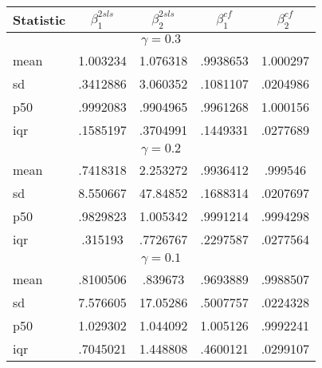 
\begin{tabular}{|l|c|c|c|c|}
\hline
Statistic & $\beta_1^{2sls}$ & $\beta_2^{2sls}$ & $\beta_1^{cf}$ & $\beta_2^{cf}$ \\ \hline
\multicolumn{5}{|c|}{$\gamma = 0.3$} \\ \hline
mean & 1.003234 & 1.076318 & .9938653 & 1.000297 \\
sd & .3412886 & 3.060352 & .1081107 & .0204986 \\
p50 & .9992083 & .9904965 & .9961268 & 1.000156 \\
iqr & .1585197 & .3704991 & .1449331 & .0277689 \\ \hline
\multicolumn{5}{|c|}{$\gamma = 0.2$} \\ \hline
mean & .7418318 & 2.253272 & .9936412 & .999546 \\
sd & 8.550667 & 47.84852 & .1688314 & .0207697 \\
p50 & .9829823 & 1.005342 & .9991214 & .9994298 \\
iqr & .315193 & .7726767 & .2297587 & .0277564 \\ \hline
\multicolumn{5}{|c|}{$\gamma = 0.1$} \\ \hline
mean & .8100506 & .839673 & .9693889 & .9988507 \\
sd & 7.576605 & 17.05286 & .5007757 & .0224328 \\
p50 & 1.029302 & 1.044092 & 1.005126 & .9992241 \\
iqr & .7045021 & 1.448808 & .4600121 & .0299107 \\ \hline
\end{tabular}



